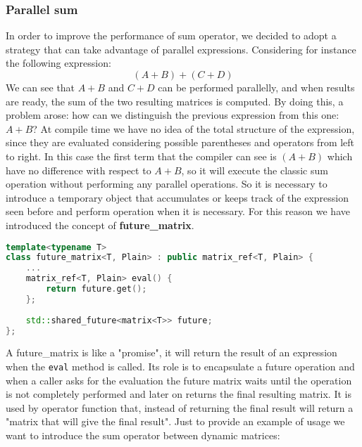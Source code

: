 \documentclass[10pt,a4paper]{article}
\begin{document}
\subsubsection{Parallel sum}
In order to improve the performance of sum operator, we decided to adopt a strategy that can take advantage of parallel expressions.
Considering for instance the following expression:
$$(A+B) + (C+D)$$
We can see that $A+B$ and $C+D$ can be performed parallelly, and when results are ready, the sum of the two resulting matrices is computed. By doing this, a problem arose: how can we distinguish the previous expression from this one: $A+B$? 
At compile time we have no idea of the total structure of the expression, since they are evaluated considering possible parentheses and operators from left to right. In this case the first term that the compiler can see is $(A+B)$ which have no difference with respect to $A+B$, so it will execute the classic sum operation without performing any parallel operations. So it is necessary to introduce a temporary object that accumulates or keeps track of the expression seen before and perform operation when it is necessary.
For this reason we have introduced the concept of \textbf{future\_matrix}.
\newpage
\begin{lstlisting}[language= C++]
template<typename T>
class future_matrix<T, Plain> : public matrix_ref<T, Plain> {
	...
	matrix_ref<T, Plain> eval() {
	    return future.get();
    }; 
    
	std::shared_future<matrix<T>> future;
};
\end{lstlisting}
A future\_matrix is like a "promise", it will return the result of an expression when the \verb|eval| method is called. Its role is to encapsulate a future operation and when a caller asks for the evaluation the future matrix waits until the operation is not completely performed and later on returns the final resulting matrix. It is used by operator function that, instead of returning the final result will return a "matrix that will give the final result".  Just to provide an example of usage we want to introduce the sum operator between dynamic matrices:
\end{document}
